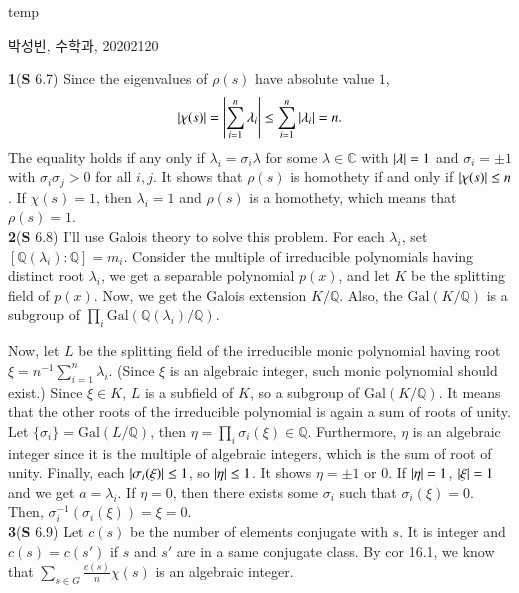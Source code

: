 \documentclass[a4paper, 12pt]{article}
\theoremstyle{Mydefinition}
\theoremstyle{Mytheorem}
\begin{document}
\thispagestyle{myfirstpage}
\begin{center}
	\Large{temp}
\end{center}
박성빈, 수학과, 20202120

\noindent \textbf{1}(\textbf{S} 6.7)
Since the eigenvalues of $\rho(s)$ have absolute value $1$,
\begin{equation}
    \abs{\chi(s)} = \abs{\sum_{i=1}^n \lambda_i}\leq \sum_{i=1}^n\abs{\lambda_i} = n.
\end{equation}
The equality holds if any only if $\lambda_i = \sigma_i \lambda$ for some $\lambda\in \mathbb{C}$ with $\abs{\lambda} = 1$ and $\sigma_i = \pm 1$ with $\sigma_i\sigma_j>0$ for all $i,j$. It shows that $\rho(s)$ is homothety if and only if $\abs{\chi(s)}\leq n$. If $\chi(s) = 1$, then $\lambda_i=1$ and $\rho(s)$ is a homothety, which means that $\rho(s) = 1$.\\

\noindent \textbf{2}(\textbf{S} 6.8)
I'll use Galois theory to solve this problem. For each $\lambda_i$, set $[\mathbb{Q}(\lambda_i):\mathbb{Q}] = m_i$. Consider the multiple of irreducible polynomials having distinct root $\lambda_i$, we get a separable polynomial $p(x)$, and let $K$ be the splitting field of $p(x)$. Now, we get the Galois extension $K/\mathbb{Q}$. Also, the $\mathrm{Gal}(K/\mathbb{Q})$ is a subgroup of $\prod_{i}\mathrm{Gal}(\mathbb{Q}(\lambda_i)/\mathbb{Q})$.

Now, let $L$ be the splitting field of the irreducible monic polynomial having root $\xi=n^{-1}\sum_{i=1}^n \lambda_i$. (Since $\xi$ is an algebraic integer, such monic polynomial should exist.) Since $\xi\in K$, $L$ is a subfield of $K$, so a subgroup of $\mathrm{Gal}(K/\mathbb{Q})$. It means that the other roots of the irreducible polynomial is again a sum of roots of unity. Let $\{\sigma_i\} = \mathrm{Gal}(L/\mathbb{Q})$, then $\eta = \prod_{i} \sigma_i(\xi)\in\mathbb{Q}$. Furthermore, $\eta$ is an algebraic integer since it is the multiple of algebraic integers, which is the sum of root of unity. Finally, each $\abs{\sigma_i(\xi)}\leq 1$, so $\abs{\eta}\leq 1$. It shows $\eta = \pm 1$ or $0$. If $\abs{\eta} = 1$, $\abs{\xi} = 1$ and we get $a = \lambda_i$. If $\eta = 0$, then there exists some $\sigma_i$ such that $\sigma_i(\xi)= 0$. Then, $\sigma_{i}^{-1}\left(\sigma_i(\xi)\right) = \xi = 0$.\\

\noindent \textbf{3}(\textbf{S} 6.9)
Let $c(s)$ be the number of elements conjugate with $s$. It is integer and $c(s) = c(s')$ if $s$ and $s'$ are in a same conjugate class. By cor 16.1, we know that $\sum_{s\in G}\frac{c(s)}{n}\chi(s)$ is an algebraic integer.
\end{document}
